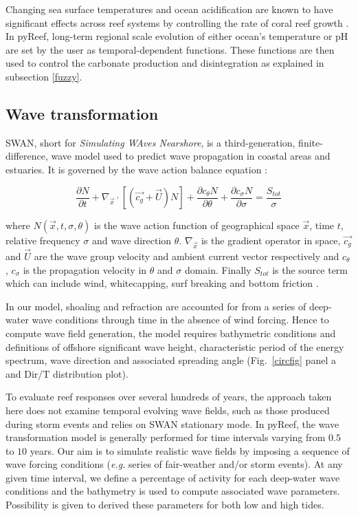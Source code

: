 \documentclass[default,jgrga]{agutex2015}
\begin{document}
\begin{article}
\noindent Changing sea surface temperatures and ocean acidification are known to have significant effects across reef systems by controlling the rate of coral reef growth \citep{Shaw12, Andersson13, Zhang13}. In pyReef, long-term regional scale evolution of either ocean's temperature or pH are set by the user as temporal-dependent functions. These functions are then used to control the carbonate production and disintegration as explained in subsection \ref{fuzzy}.

\subsection{Wave transformation}

SWAN, short for \textit{Simulating WAves Nearshore}, is a third-generation, finite-difference, wave model used to predict wave propagation in coastal areas and estuaries. It is governed by the wave action balance equation \citep{Bretherton68, Hasselmann73, Holthuijsen93, Booij99}:

\begin{equation}
 \frac{\partial N}{\partial t}+\nabla_{\vec{x}} \cdot \left[ \left( \vec{c_g} + \vec{U} \right) N \right] + \frac{\partial c_{\theta}N}{\partial \theta} + \frac{\partial c_{\sigma}N}{\partial \sigma} = \frac{S_{tot}}{\sigma}
\end{equation}

\noindent where $N(\vec{x},t,\sigma,\theta)$ is the wave action function of geographical space $\vec{x}$, time $t$, relative frequency $\sigma$ and wave direction $\theta$. $\nabla_{\vec{x}}$ is the gradient operator in space, $\vec{c_g}$ and $\vec{U}$ are the wave group velocity and ambient current vector respectively and $c_{\theta}$, $c_{\sigma}$ is the propagation velocity in $\theta$ and $\sigma$ domain. Finally $S_{tot}$ is the source term which can include wind, whitecapping, surf breaking and bottom friction \citep{Booij99}.

\noindent In our model, shoaling and refraction are accounted for from a series of deep-water wave conditions through time in the absence of wind forcing. Hence to compute wave field generation, the model requires bathymetric conditions and definitions of offshore significant wave height, characteristic period of the energy spectrum, wave direction and associated spreading angle (Fig.~\ref{circfig} panel a and Dir/T distribution plot).

\noindent To evaluate reef responses over several hundreds of years, the approach taken here does not examine temporal evolving wave fields, such as those produced during storm events and relies on SWAN stationary mode. In pyReef, the wave transformation model is generally performed for time intervals varying from $0.5$ to $10$ years. Our aim is to simulate realistic wave fields by imposing a sequence of wave forcing conditions (\textit{e.g.} series of fair-weather and/or storm events). At any given time interval, we define a percentage of activity for each deep-water wave conditions and the bathymetry is used to compute associated wave parameters. Possibility is given to derived these parameters for both low and high tides.


\end{article}
\end{document}

